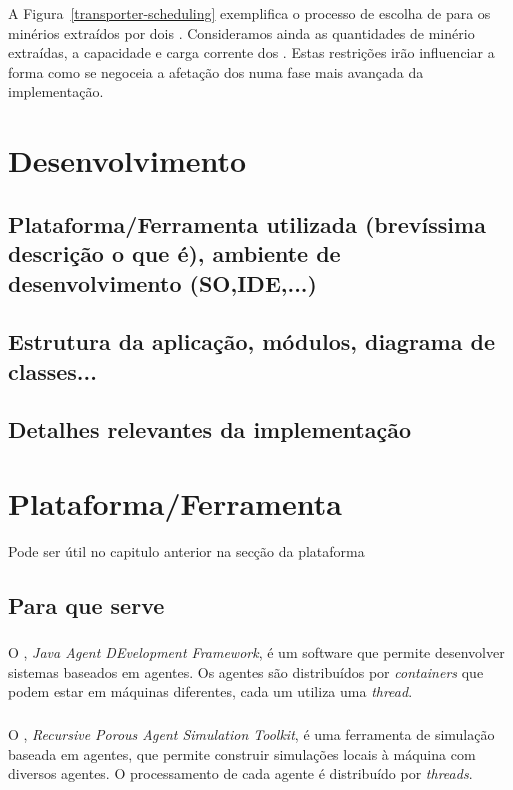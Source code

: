 \documentclass[12pt]{report}
\begin{document}
A Figura~\ref{transporter-scheduling} exemplifica o processo de escolha de \transporters para os minérios extraídos por dois \producers. Consideramos ainda as quantidades de minério extraídas, a capacidade e carga corrente dos \transporters. Estas restrições irão influenciar a forma como se negoceia a afetação dos \transporters numa fase mais avançada da implementação.

\chapter{Desenvolvimento}

\section{Plataforma/Ferramenta utilizada (brevíssima descrição o que é), ambiente de desenvolvimento (SO,IDE,...)}

\section{Estrutura da aplicação, módulos, diagrama de classes...}

\section{Detalhes relevantes da implementação}

\chapter{Plataforma/Ferramenta}
Pode ser útil no capitulo anterior na secção da plataforma
\section{Para que serve}

\subsection{\jade}
O \jade, \emph{Java Agent DEvelopment Framework}, é um software que permite desenvolver sistemas baseados em agentes. Os agentes são distribuídos por \emph{containers} que podem estar em máquinas diferentes, cada um utiliza uma \emph{thread}. 

\subsection{\repast}
O \repast, \emph{Recursive Porous Agent Simulation Toolkit}, é uma ferramenta de simulação baseada em agentes, que permite construir simulações locais à máquina com diversos agentes. O processamento de cada agente é distribuído por \emph{threads}.
\end{document}
